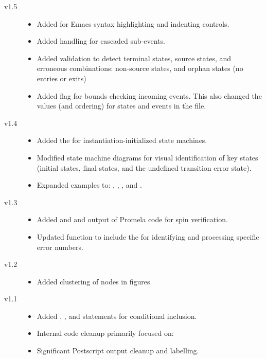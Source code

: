 \begin{description}
\item[v1.5]
  \begin{itemize}
  \item Added  for Emacs syntax highlighting and
    indenting controls.
  \item Added handling for cascaded sub-events.
  \item Added validation to detect terminal states, source states, and
    erroneous combinations: non-\INITSTATE source states, and
    orphan states (no entries or exits)
  \item Added  flag for bounds checking incoming events.
    This also changed the values (and ordering) for states and events
    in the  file.
  \end{itemize}
  
\item[v1.4]
  \begin{itemize}
  \item Added the \INITSTATE for instantiation-initialized state
    machines.
  \item Modified state machine diagrams for visual identification of
    key states (initial states, final states, and the undefined
    transition error state).
  \item Expanded examples to: , ,
    , and .
  \end{itemize}
  
\item[v1.3]
  \begin{itemize}
  \item Added \PROMELAbegin and \PROMELAend and output of Promela code
    for spin verification.
  \item Updated  function to include the
     for identifying and processing specific error
    numbers.
  \end{itemize}
  
\item[v1.2]
  \begin{itemize}
  \item Added clustering of nodes in figures
  \end{itemize}
  
\item[v1.1]
  \begin{itemize}
  \item Added \SMDEF, \SMIF, and \SMEND statements for conditional
    inclusion.
  \item Internal code cleanup primarily focused on:
  \item Significant Postscript output cleanup and labelling.
  \end{itemize}
  

\end{description}
